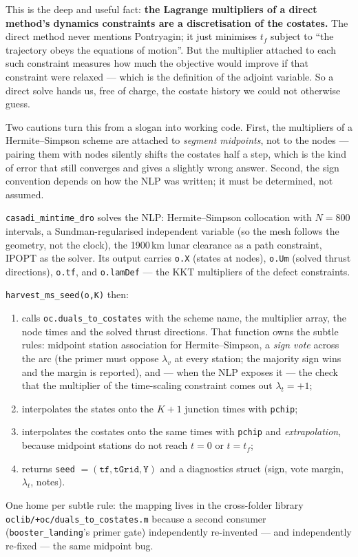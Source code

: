 \documentclass[11pt]{article}
\newcommand{\lv}{\lambda_v}\newcommand{\lr}{\lambda_r}\newcommand{\lm}{\lambda_m}
\newcommand{\tf}{t_f}\newcommand{\R}{\mathbb{R}}
\newcommand{\file}[1]{\texttt{#1}}
\begin{document}
\begin{intu}
This is the deep and useful fact: \textbf{the Lagrange multipliers of a
direct method's dynamics constraints are a discretisation of the costates.}
The direct method never mentions Pontryagin; it just minimises $\tf$ subject
to ``the trajectory obeys the equations of motion''. But the multiplier
attached to each such constraint measures how much the objective would
improve if that constraint were relaxed --- which is the definition of the
adjoint variable. So a direct solve hands us, free of charge, the costate
history we could not otherwise guess.

Two cautions turn this from a slogan into working code. First, the
multipliers of a Hermite--Simpson scheme are attached to \emph{segment
midpoints}, not to the nodes --- pairing them with nodes silently shifts the
costates half a step, which is the kind of error that still converges and
gives a slightly wrong answer. Second, the sign convention depends on how the
NLP was written; it must be determined, not assumed.
\end{intu}

\begin{rig}
\file{casadi\_mintime\_dro} solves the NLP: Hermite--Simpson collocation with
$N=800$ intervals, a Sundman-regularised independent variable (so the mesh
follows the geometry, not the clock), the 1900\,km lunar clearance as a path
constraint, IPOPT as the solver. Its output carries \file{o.X} (states at
nodes), \file{o.Um} (solved thrust directions), \file{o.tf}, and
\file{o.lamDef} --- the KKT multipliers of the defect constraints.

\file{harvest\_ms\_seed(o,K)} then:
\begin{enumerate}[nosep]
\item calls \file{oc.duals\_to\_costates} with the scheme name, the multiplier
      array, the node times and the solved thrust directions. That function
      owns the subtle rules: midpoint station association for
      Hermite--Simpson, a \emph{sign vote} across the arc (the primer must
      oppose $\lv$ at every station; the majority sign wins and the margin is
      reported), and --- when the NLP exposes it --- the check that the
      multiplier of the time-scaling constraint comes out $\lambda_t = +1$;
\item interpolates the states onto the $K{+}1$ junction times with
      \texttt{pchip};
\item interpolates the costates onto the same times with
      \texttt{pchip} and \emph{extrapolation}, because midpoint stations do
      not reach $t=0$ or $t=\tf$;
\item returns \file{seed} $= (\file{tf},\file{tGrid},\file{Y})$ and a
      diagnostics struct (sign, vote margin, $\lambda_t$, notes).
\end{enumerate}
One home per subtle rule: the mapping lives in the cross-folder library
\file{oclib/+oc/duals\_to\_costates.m} because a second consumer
(\file{booster\_landing}'s primer gate) independently re-invented --- and
independently re-fixed --- the same midpoint bug.
\end{rig}
\end{document}
